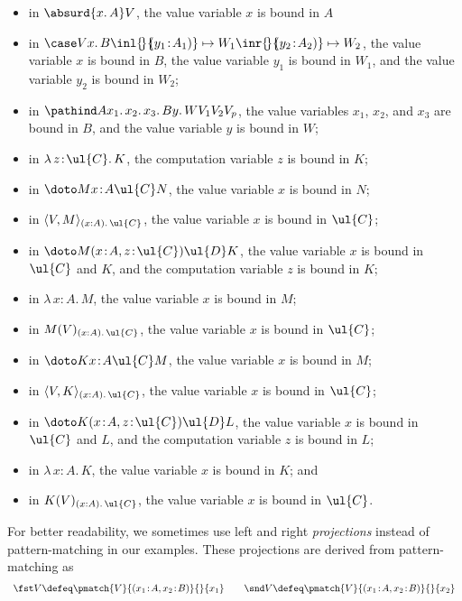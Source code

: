 \begin{definition}
\begin{itemize}
\item in $\absurd {x.\,A} V$, the value variable $x$ is bound in $A$
\item in $\case V {x.\, B} {\inl {\!} {\!\!(y_1 \!:\! A_1)} \mapsto W_1} {\inr {\!} {\!\!(y_2 \!:\! A_2)} \mapsto W_2}$, the value variable $x$ is bound in $B$, the value variable $y_1$ is bound in $W_1$, and the value variable $y_2$ is bound in $W_2$;
\item in $\pathind A {x_1.\, x_2.\, x_3.\, B} {y.\, W} {V_1} {V_2} {V_p}$, the value variables $x_1$, $x_2$,  and $x_3$ are bound in $B$, and the value variable $y$ is bound in $W$;
\item in $\lambda\, z \!:\! \ul{C} .\, K$, the computation variable $z$ is bound in $K$;
\item in $\doto M {x \!:\! A} {\ul{C}} N$, the value variable $x$ is bound in $N$;
\item in $\langle V , M \rangle_{(x : A).\, \ul{C}}$, the value variable $x$ is bound in $\ul{C}$;
\item in $\doto M {(x \!:\! A, z \!:\! \ul{C})} {\ul{D}} K$, the value variable $x$ is bound in $\ul{C}$ and $K$, and the computation variable $z$ is bound in $K$;
\item in $\lambda \, x \!:\! A .\, M$, the value variable $x$ is bound in $M$;
\item in $M(V)_{(x : A).\,\ul{C}}$, the value variable $x$ is bound in $\ul{C}$;
\item in $\doto K {x \!:\! A} {\ul{C}} M$, the value variable $x$ is bound in $M$;
\item in $\langle V , K \rangle_{(x : A).\, \ul{C}}$, the value variable $x$ is bound in $\ul{C}$;
\item in $\doto K {(x \!:\! A, z \!:\! \ul{C})} {\ul{D}} L$, the value variable $x$ is bound in $\ul{C}$ and $L$, and the computation variable $z$ is bound in $L$;
\item in $\lambda \, x \!:\! A .\, K$, the value variable $x$ is bound in $K$; and
\item in $K(V)_{(x : A).\, \ul{C}}$, the value variable $x$ is bound in $\ul{C}$.
\end{itemize}
\end{definition}

For better readability, we sometimes use left and right \emph{projections} instead of pattern-matching in our examples. These projections are derived from pattern-matching as
\[
\begin{array}{c}
\fst V \defeq \pmatch {V} {(x_1 \!:\! A , x_2 \!:\! B)} {} {x_1}
\qquad
\snd V \defeq \pmatch {V} {(x_1 \!:\! A , x_2 \!:\! B)} {} {x_2}
\end{array}
\]

